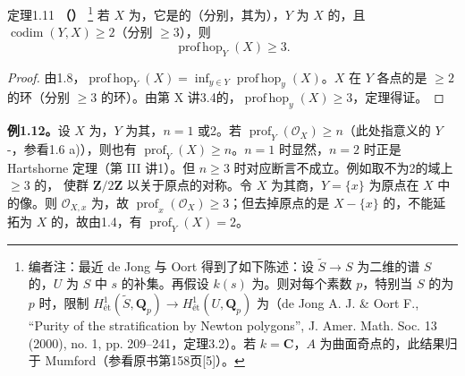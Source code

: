 \begin{SGAresult}{定理}{1.11}
\textbf{（）}
\footnote{编者注：最近 de Jong 与 Oort 得到了如下陈述：设 $\widetilde S\to S$ 为二维的谱 $S$ 的，$U$ 为 $S$ 中 $s$ 的补集。再假设 $k(s)$ 为。则对每个素数 $p$，特别当 $S$ 的为 $p$ 时，限制 $H^1_{\text{ét}}(\widetilde S,\mathbf Q_p)\to H^1_{\text{ét}}(U,\mathbf Q_p)$ 为（de Jong A. J. \& Oort F., ``Purity of the stratification by Newton polygons'', J. Amer. Math. Soc. 13 (2000), no. 1, pp. 209--241，定理3.2）。若 $k=\mathbf C$，$A$ 为曲面奇点的，此结果归于 Mumford（参看原书第158页[5]）。}
若 $X$ 为，它是的（分别，其为），$Y$ 为 $X$ 的，且 $\operatorname{codim}(Y,X)\geq2$（分别 $\geq3$），则
\[\operatorname{prof\,hop}_Y(X)\geq3.\]
\end{SGAresult}
\begin{proof}
由1.8，$\operatorname{prof\,hop}_Y(X)=\inf_{y\in Y}\operatorname{prof\,hop}_y(X)$。$X$ 在 $Y$ 各点的是 $\geq2$ 的环（分别 $\geq3$ 的环）。由第 X 讲3.4的，$\operatorname{prof\,hop}_y(X)\geq3$，定理得证。
\end{proof}
\textbf{例1.12。}设 $X$ 为，$Y$ 为其，$n=1$ 或2。若 $\operatorname{prof}_Y(\mathcal O_X)\geq n$（此处指意义的 $Y$-，参看1.6 a)），则也有 $\operatorname{prof}_Y(X)\geq n$。$n=1$ 时显然，$n=2$ 时正是 Hartshorne 定理（第 III 讲1）。但 $n\geq3$ 时对应断言不成立。例如取不为2的域上 $\geq3$ 的，
使群 $\mathbf Z/2\mathbf Z$ 以关于原点的对称。令 $X$ 为其商，$Y=\{x\}$ 为原点在 $X$ 中的像。则 $\mathcal O_{X,x}$ 为，故 $\operatorname{prof}_x(\mathcal O_X)\geq3$；但去掉原点的是 $X-\{x\}$ 的，不能延拓为 $X$ 的，故由1.4，有 $\operatorname{prof}_Y(X)=2$。

